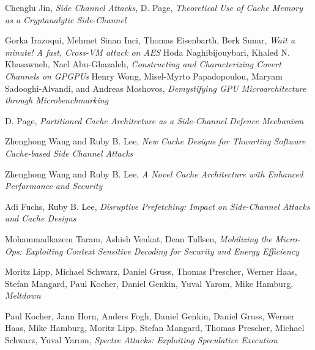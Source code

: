\documentclass[twoside]{iitbreport}
\begin{document}

%
\begin{thebibliography}{99}
Chenglu Jin, {\it Side Channel Attacks},
D. Page, {\it Theoretical Use of Cache Memory as a Cryptanalytic Side-Channel}

Gorka Irazoqui, Mehmet Sinan Inci, Thomas Eisenbarth, Berk Sunar,  {\it Wait a minute! A fast, Cross-VM attack on AES}
Hoda Naghibijouybari,
Khaled N. Khasawneh,
Nael Abu-Ghazaleh, 
{\it Constructing and Characterizing Covert Channels on GPGPUs}
Henry Wong, Misel-Myrto Papadopoulou, Maryam Sadooghi-Alvandi, and Andreas Moshovos, {\it Demystifying GPU Microarchitecture through Microbenchmarking}

D. Page, {\it Partitioned Cache Architecture as a Side-Channel Defence Mechanism}

Zhenghong Wang and Ruby B. Lee, {\it New Cache Designs for Thwarting Software Cache-based Side Channel Attacks}

Zhenghong Wang and Ruby B. Lee, {\it A Novel Cache Architecture with Enhanced Performance and Security}

Adi Fuchs, Ruby B. Lee, {\it Disruptive Prefetching: Impact on Side-Channel Attacks and Cache Designs}

Mohammadkazem Taram, Ashish Venkat, Dean Tullsen, {\it Mobilizing the Micro-Ops: Exploiting Context Sensitive Decoding for Security and Energy Efficiency}

Moritz Lipp, Michael Schwarz, Daniel Gruss, Thomas Prescher, Werner Haas,
Stefan Mangard, Paul Kocher, Daniel Genkin, Yuval Yarom, Mike Hamburg, {\it Meltdown}

Paul Kocher, Jann Horn, Anders Fogh, Daniel Genkin, Daniel Gruss, Werner Haas, Mike Hamburg, Moritz Lipp, Stefan Mangard, Thomas Prescher, Michael Schwarz, Yuval Yarom, {\it Spectre Attacks: Exploiting Speculative Execution}

\end{thebibliography}
\end{document}

